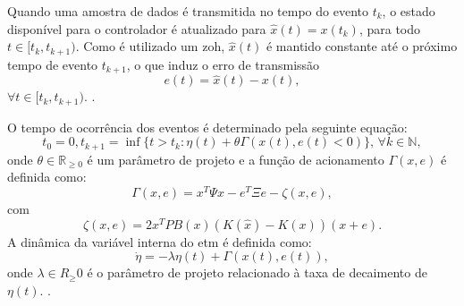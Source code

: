 Quando uma amostra de dados é transmitida no tempo do evento $t_k$, o estado disponível para o controlador é atualizado para $\hat{x}(t) = x(t_k)$, para todo $t \in [t_k, t_{k+1})$. Como é utilizado um \acrshort{zoh}, $\hat{x}(t)$ é mantido constante até o próximo tempo de evento $t_{k+1}$, o que induz o erro de transmissão \begin{equation}e(t) = \hat{x}(t) - x(t) \label{eq:etm-error},\end{equation} $\forall t \in [t_k, t_{k+1})$. \cite{coutinho2021}.

O tempo de ocorrência dos eventos é determinado pela seguinte equação: \begin{equation} t_0 = 0, t_{k+1} = \inf \{t > t_k : \eta(t) + \theta \Gamma(x(t), e(t) < 0) \}, \, \forall k \in \mathbb{N}, \end{equation} onde $\theta \in \mathbb{R}_{\geq 0}$ é um parâmetro de projeto e a função de acionamento $\Gamma(x, e)$ é definida como: \begin{equation} \label{eq:etm-gama} \Gamma(x, e) = x^T \Psi x - e^T \Xi e - \zeta (x,e), \end{equation} com \begin{equation} \zeta(x, e) = 2x^TPB(x)(K(\hat{x}) - K(x))(x+e). \end{equation} A dinâmica da variável interna do \acrshort{etm} é definida como: \begin{equation}  \dot{\eta} = - \lambda \eta(t) + \Gamma(x(t), e(t)), \end{equation} onde $\lambda \in R_{\geq} 0 $ é o parâmetro de projeto relacionado à taxa de decaimento de $\eta(t)$. \cite{coutinho2021}.


